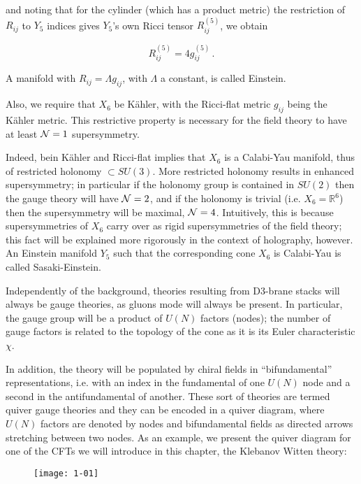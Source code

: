 and noting that for the cylinder (which has a product metric) the restriction of $R_{ij}$ to $Y_5$ indices gives $Y_5$'s own Ricci tensor $R_{ij}^{(5)}$, we obtain

\begin{equation}
	R^{(5)}_{ij} = 4 g_{ij}^{(5)}\,.
\end{equation}

A manifold with $R_{ij} = \Lambda g_{ij}$, with $\Lambda$ a constant, is called Einstein.

Also, we require that $X_6$ be K\"ahler, with the Ricci-flat metric $g_{ij}$ being the K\"ahler metric. This restrictive property is necessary \cite{KW_SCFT} for the field theory to have at least $\mathcal{N} = 1$ supersymmetry.

Indeed, bein K\"ahler and Ricci-flat implies that $X_6$ is a Calabi-Yau manifold, thus of restricted holonomy $\subset SU(3)$. More restricted holonomy results in enhanced supersymmetry; in particular if the holonomy group is contained in $SU(2)$ then the gauge theory will have $\mathcal{N} = 2$, and if the holonomy is trivial (i.e. $X_6 = \mathbb{R}^6$) then the supersymmetry will be maximal, $\mathcal{N} = 4$. Intuitively, this is because supersymmetries of $X_6$ carry over as rigid supersymmetries of the field theory; this fact will be explained more rigorously in the context of holography, however. An Einstein manifold $Y_5$ such that the corresponding cone $X_6$ is Calabi-Yau is called Sasaki-Einstein.

Independently of the background, theories resulting from D3-brane stacks will always be gauge theories, as gluons mode will always be present. In particular, the gauge group will be a product of $U(N)$ factors (nodes); the number of gauge factors is related to the topology of the cone as it is its Euler characteristic $\chi$.

In addition, the theory will be populated by chiral fields in ``bifundamental'' representations, i.e. with an index in the fundamental of one $U(N)$ node and a second in the antifundamental of another. These sort of theories are termed quiver gauge theories and they can be encoded in a quiver diagram, where $U(N)$ factors are denoted by nodes and bifundamental fields as directed arrows stretching between two nodes. As an example, we present the quiver diagram for one of the CFTs we will introduce in this chapter, the Klebanov Witten theory:

\begin{figure}[H]
	\centering
	\texttt{[image: 1-01]}
\end{figure}


